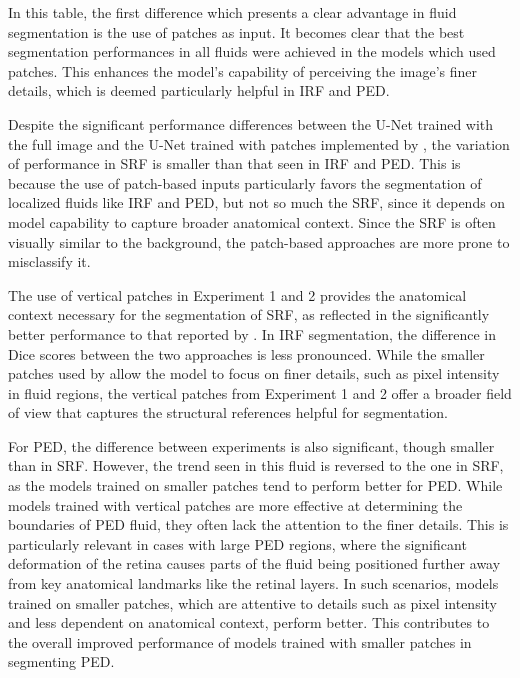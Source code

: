 In this table, the first difference which presents a clear advantage in fluid segmentation is the use of patches as input. It becomes clear that the best segmentation performances in all fluids were achieved in the models which used patches. This enhances the model's capability of perceiving the image's finer details, which is deemed particularly helpful in IRF and PED.
\par
Despite the significant performance differences between the U-Net trained with the full image and the U-Net trained with patches implemented by \textcite{Alsaih2020}, the variation of performance in SRF is smaller than that seen in IRF and PED. This is because the use of patch-based inputs particularly favors the segmentation of localized fluids like IRF and PED, but not so much the SRF, since it depends on model capability to capture broader anatomical context. Since the SRF is often visually similar to the background, the patch-based approaches are more prone to misclassify it.
\par 
The use of vertical patches in Experiment 1 and 2 provides the anatomical context necessary for the segmentation of SRF, as reflected in the significantly better performance to that reported by \textcite{Alsaih2020}. In IRF segmentation, the difference in Dice scores between the two approaches is less pronounced. While the smaller patches used by \textcite{Alsaih2020} allow the model to focus on finer details, such as pixel intensity in fluid regions, the vertical patches from Experiment 1 and 2 offer a broader field of view that captures the structural references helpful for segmentation.
\par
For PED, the difference between experiments is also significant, though smaller than in SRF. However, the trend seen in this fluid is reversed to the one in SRF, as the models trained on smaller patches tend to perform better for PED. While models trained with vertical patches are more effective at determining the boundaries of PED fluid, they often lack the attention to the finer details. This is particularly relevant in cases with large PED regions, where the significant deformation of the retina causes parts of the fluid being positioned further away from key anatomical landmarks like the retinal layers. In such scenarios, models trained on smaller patches, which are attentive to details such as pixel intensity and less dependent on anatomical context, perform better. This contributes to the overall improved performance of models trained with smaller patches in segmenting PED.
\par
